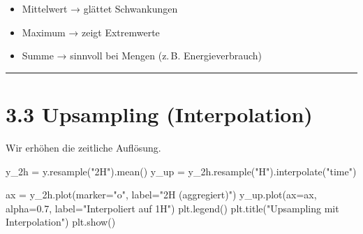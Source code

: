 \documentclass[
  ngerman,
  letterpaper,
  DIV=11]{scrreprt}
\newenvironment{Shaded}{\begin{snugshade}}{\end{snugshade}}
\newcommand{\FloatTok}[1]{\textcolor[rgb]{0.68,0.00,0.00}{#1}}
\newcommand{\NormalTok}[1]{\textcolor[rgb]{0.00,0.23,0.31}{#1}}
\newcommand{\OperatorTok}[1]{\textcolor[rgb]{0.37,0.37,0.37}{#1}}
\newcommand{\StringTok}[1]{\textcolor[rgb]{0.13,0.47,0.30}{#1}}
\providecommand{\tightlist}{%
  \setlength{\itemsep}{0pt}\setlength{\parskip}{0pt}}
\begin{document}
\begin{tcolorbox}[enhanced jigsaw, titlerule=0mm, title=\textcolor{quarto-callout-tip-color}{\faLightbulb}\hspace{0.5em}{Entscheidungshilfe}, bottomrule=.15mm, opacityback=0, colbacktitle=quarto-callout-tip-color!10!white, coltitle=black, opacitybacktitle=0.6, colframe=quarto-callout-tip-color-frame, toprule=.15mm, leftrule=.75mm, arc=.35mm, rightrule=.15mm, breakable, bottomtitle=1mm, colback=white, toptitle=1mm, left=2mm]

\begin{itemize}
\tightlist
\item
  Mittelwert → glättet Schwankungen\\
\item
  Maximum → zeigt Extremwerte\\
\item
  Summe → sinnvoll bei Mengen (z.\,B. Energieverbrauch)
\end{itemize}

\end{tcolorbox}

\begin{center}\rule{0.5\linewidth}{0.5pt}\end{center}

\section{3.3 Upsampling (Interpolation)}\label{upsampling-interpolation}

Wir erhöhen die zeitliche Auflösung.

\begin{Shaded}
\begin{Highlighting}[]
\NormalTok{y\_2h }\OperatorTok{=}\NormalTok{ y.resample(}\StringTok{"2H"}\NormalTok{).mean()}
\NormalTok{y\_up }\OperatorTok{=}\NormalTok{ y\_2h.resample(}\StringTok{"H"}\NormalTok{).interpolate(}\StringTok{"time"}\NormalTok{)}

\NormalTok{ax }\OperatorTok{=}\NormalTok{ y\_2h.plot(marker}\OperatorTok{=}\StringTok{"o"}\NormalTok{, label}\OperatorTok{=}\StringTok{"2H (aggregiert)"}\NormalTok{)}
\NormalTok{y\_up.plot(ax}\OperatorTok{=}\NormalTok{ax, alpha}\OperatorTok{=}\FloatTok{0.7}\NormalTok{, label}\OperatorTok{=}\StringTok{"Interpoliert auf 1H"}\NormalTok{)}
\NormalTok{plt.legend()}
\NormalTok{plt.title(}\StringTok{"Upsampling mit Interpolation"}\NormalTok{)}
\NormalTok{plt.show()}
\end{Highlighting}
\end{Shaded}
\end{document}
